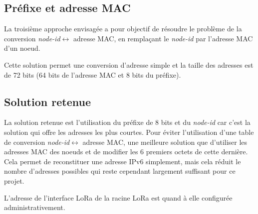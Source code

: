 \subsection*{Préfixe et adresse MAC}
    La troisième approche envisagée a pour objectif de résoudre le problème de la conversion \textit{node-id}$\leftrightarrow	$ adresse MAC, en remplaçant le \textit{node-id} par l'adresse MAC d'un noeud.

    Cette solution permet une conversion d'adresse simple et la taille des adresses est de 72 bits (64 bits de l'adresse MAC et 8 bits du préfixe).

\subsection*{Solution retenue}
    La solution retenue est l'utilisation du préfixe de 8 bits et du \textit{node-id} car c'est la solution qui offre les adresses les plus courtes. Pour éviter l'utilisation d'une table de conversion \textit{node-id}$\leftrightarrow$ adresse MAC, une meilleure solution que d'utiliser les adresses MAC des noeuds et de modifier les 6 premiers octets de cette dernière. Cela permet de reconstituer une adresse IPv6 simplement, mais cela réduit le nombre d'adresses possibles qui reste cependant largement suffisant pour ce projet.

    L'adresse de l'interface LoRa de la racine LoRa est quand à elle configurée administrativement.

